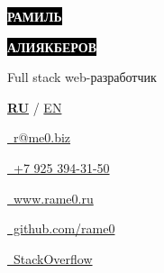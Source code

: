 \documentclass[10pt]{tpl/developercv} %
\begin{document}

\begin{minipage}[t]{0.44\textwidth} %
	\vspace{-\baselineskip} %

	\colorbox{black}{{\Huge\textcolor{white}{\textbf{\MakeUppercase{Рамиль}}}}} %

	\colorbox{black}{{\Huge\textcolor{white}{\textbf{\MakeUppercase{Алиякберов}}}}} %

	\vspace{6pt}

  \bigskip
	{\Large Full stack web-разработчик} %

  \vspace{6pt}

  \textbf{\underline{RU}} / \href{https://rame0.github.io/resume-latex/resume_en.pdf}{EN}

\end{minipage}
\begin{minipage}[t]{0.275\textwidth} %
	\vspace{-\baselineskip} %


	\href{mailto:r@me0.biz}{\ r@me0.biz}

	\href{tel:+79253943150}{\ +7 925 394-31-50}
\end{minipage}
\begin{minipage}[t]{0.275\textwidth} %
	\vspace{-\baselineskip} %

	\href{https://www.rame0.ru/}{\ www.rame0.ru}

	\href{https://github.com/rame0}{\ github.com/rame0}

	\href{https://stackoverflow.com/users/513723/rame0}{\ StackOverflow}

\end{minipage}
\end{document}
